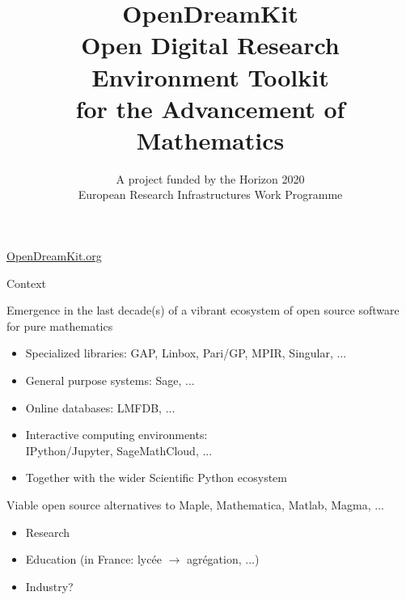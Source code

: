 \documentclass[
  usenames,svgnames, %
  compress,
  ]{beamer}
\title{{\huge \color{red} OpenDreamKit}\\
  Open Digital Research Environment Toolkit\\
  for the Advancement of Mathematics\\}
\subtitle{A project funded by the Horizon 2020\\
  European Research Infrastructures Work Programme}
\begin{document}
\begin{frame}
  \maketitle

  \Huge
  \centerline{\url{OpenDreamKit.org}}
\end{frame}


\begin{frame}{Context}
  \begin{block}{Emergence in the last decade(s) of a vibrant ecosystem
      of open source software for pure mathematics}

    \begin{itemize}
    \item Specialized libraries: GAP, Linbox, Pari/GP, MPIR, Singular,
      ...
    \item General purpose systems: Sage, ...
    \item Online databases: LMFDB, ...
    \item Interactive computing environments:\\
      IPython/Jupyter, SageMathCloud, ...
    \item Together with the wider Scientific Python ecosystem
    \end{itemize}
  \end{block}
  \pause
  \bigskip

  \begin{block}{Viable open source alternatives to Maple, Mathematica,
      Matlab, Magma, ...}
    \begin{itemize}
    \item Research
    \item Education (in France: lycée $\longrightarrow$ agrégation, ...)
    \item Industry?
    \end{itemize}
  \end{block}
\end{frame}
\end{document}
